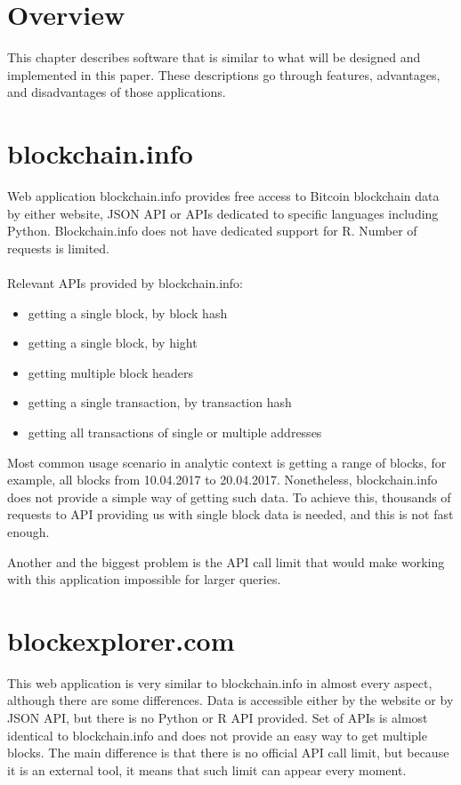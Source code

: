 \documentclass[12pt, en, eng, oneside, final]{mgr}
\begin{document}
\section{Overview}
This chapter describes software that is similar to what will be designed and implemented in this paper. These descriptions go through features, advantages, and disadvantages of those applications. 

\section{blockchain.info}

Web application blockchain.info \cite{blokchain.info} provides free access to Bitcoin blockchain data by either website, JSON API or APIs dedicated to specific languages including Python. Blockchain.info does not have dedicated support for R. Number of requests is limited.
\\
\\
Relevant APIs provided by blockchain.info:
\begin{itemize}
\item
getting a single block, by block hash
\item
getting a single block, by hight
\item
getting multiple block headers
\item
getting a single transaction, by transaction hash
\item
getting all transactions of single or multiple addresses


\end{itemize}

Most common usage scenario in analytic context is getting a range of blocks, for example, all blocks from 10.04.2017 to 20.04.2017. Nonetheless, blockchain.info does not provide a simple way of getting such data. To achieve this, thousands of requests to API providing us with single block data is needed, and this is not fast enough.

Another and the biggest problem is the API call limit that would make working with this application impossible for larger queries.

\section{blockexplorer.com}

This web application \cite{blockexpolrer} is very similar to blockchain.info in almost every aspect, although there are some differences. Data is accessible either by the website or by JSON API, but there is no Python or R API provided. Set of APIs is almost identical to blockchain.info and does not provide an easy way to get multiple blocks. The main difference is that there is no official API call limit, but because it is an external tool, it means that such limit can appear every moment.
\end{document}
